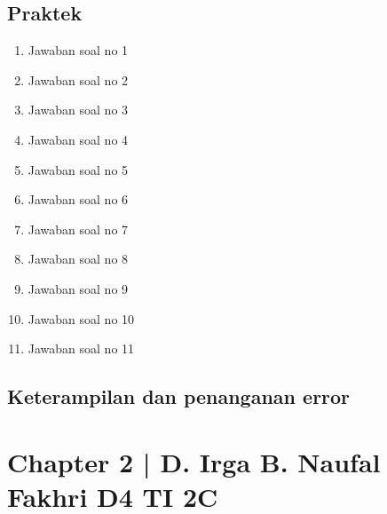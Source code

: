 \subsection{Praktek}
\begin{enumerate}
    \item Jawaban soal no 1
    
    \item Jawaban soal no 2
    
    \item Jawaban soal no 3
    
    \item Jawaban soal no 4
    
    \item Jawaban soal no 5
    
    \item Jawaban soal no 6
    
    \item Jawaban soal no 7
    
    \item Jawaban soal no 8
    
    \item Jawaban soal no 9
    
    \item Jawaban soal no 10
    
    \item Jawaban soal no 11
    
\end{enumerate}

\subsection{Keterampilan dan penanganan error}
    


\section{Chapter 2 | D. Irga B. Naufal Fakhri D4 TI 2C}
